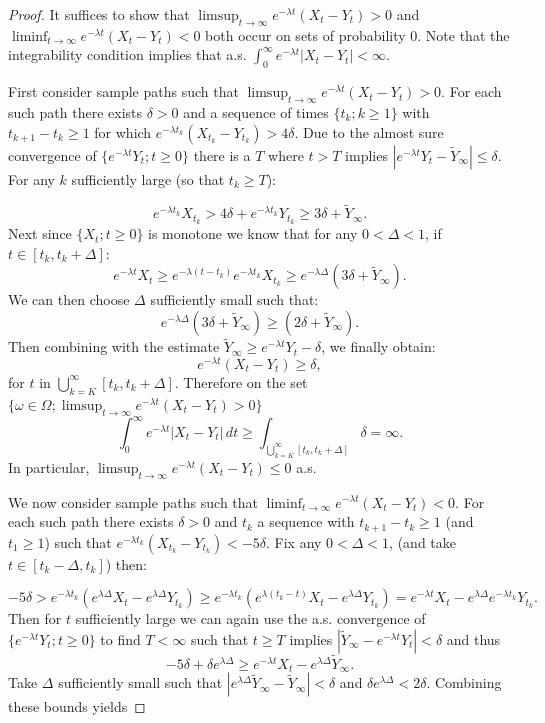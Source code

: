 \documentclass{article}
\numberwithin{equation}{section}
\begin{document}
\begin{proof}
It suffices to show that $\limsup_{t\to\infty} e^{-\lambda t}(X_t-Y_t)>0$ and $\liminf_{t\to\infty} e^{-\lambda t}(X_t-Y_t)<0$ both occur on sets of probability 0. Note that the integrability condition implies that a.s. $\int_0^\infty e^{-\lambda t}|X_t-Y_t|<\infty$. 

First consider sample paths such that $\limsup_{t\to\infty} e^{-\lambda t}(X_t-Y_t)>0$. For each such path there exists $\delta>0$ and a sequence of times $\{t_k;k\geq 1\}$ with $t_{k+1}-t_k\geq 1$ for which $e^{-\lambda t_k}(X_{t_k}-Y_{t_k})>4\delta$. Due to the almost sure convergence of $\{e^{-\lambda t}Y_t;t\geq 0\}$ there is a $T$ where $t>T$ implies $|e^{-\lambda t}Y_t-\widetilde{Y}_{\infty}|\leq \delta$. For any $k$ sufficiently large (so that $t_k\geq T$):

  \[e^{-\lambda t_k}X_{t_k}>4\delta+e^{-\lambda t_k}Y_{t_k}\geq 3\delta +\widetilde{Y}_{\infty}.\]
Next since $\{X_t;t\geq 0\}$ is monotone we know that for any $0<\Delta<1$, if $t\in [t_k,t_k+\Delta]$:
  \[e^{-\lambda t}X_t\geq e^{-\lambda (t-t_k)}e^{-\lambda t_k}X_{t_k}\geq e^{-\lambda \Delta}(3\delta+\widetilde{Y}_\infty).\]
We can then choose $\Delta$ sufficiently small such that:
  \[e^{-\lambda \Delta}(3\delta+\widetilde{Y}_\infty)\geq (2\delta + \widetilde{Y}_\infty).\]
Then combining with the estimate $\widetilde{Y}_\infty\geq e^{-\lambda t}Y_t-\delta$, we finally obtain:
  \[e^{-\lambda t}(X_t-Y_t)\geq \delta,\]
for $t$ in $\bigcup_{k=K}^\infty[t_k,t_k+\Delta]$. Therefore on the set $\{\omega\in \Omega; \limsup_{t\to\infty}e^{-\lambda t}(X_t-Y_t)>0\}$
  \[\int_0^\infty e^{-\lambda t}|X_t-Y_t|\,dt\geq \int_{\bigcup_{k=K}^\infty[t_k,t_k+\Delta]}\delta=\infty.\]
In particular, $\limsup_{t\to\infty}e^{-\lambda t}(X_t-Y_t)\leq 0$ a.s.

We now consider sample paths such that $\liminf_{t\to\infty}e^{-\lambda t}(X_t-Y_t)<0$. For each such path there exists  $\delta>0$ and $t_k$ a sequence with $t_{k+1}-t_k\geq 1$ (and $t_1\geq 1$) such that $e^{-\lambda t_k}(X_{t_k}-Y_{t_k})<-5\delta$. Fix any $0<\Delta<1$, (and take $t\in [t_k-\Delta,t_k]$) then:

  \[-5\delta >e^{-\lambda t_k}(e^{\lambda\Delta}X_t-e^{\lambda \Delta} Y_{t_k})\geq e^{-\lambda t_k}(e^{\lambda (t_k-t)}X_t-e^{\lambda\Delta}Y_{t_k})=e^{-\lambda t}X_t-e^{\lambda\Delta}e^{-\lambda t_k}Y_{t_k}.\]
Then for $t$ sufficiently large we can again use the a.s. convergence of $\{e^{-\lambda t} Y_t;t\geq 0\}$ to find $T<\infty$ such that $t\geq T$ implies $|\widetilde{Y}_\infty-e^{-\lambda t}Y_t|<\delta$ and thus
  \[-5\delta +\delta e^{\lambda\Delta}\geq e^{-\lambda t}X_t - e^{\lambda\Delta}\widetilde{Y}_\infty.\]
Take $\Delta$ sufficiently small such that $|e^{\lambda\Delta}\widetilde{Y}_\infty-\widetilde{Y}_\infty|<\delta$ and $\delta e^{\lambda\Delta}<2\delta$. Combining these bounds yields 


\end{proof}
\end{document}
